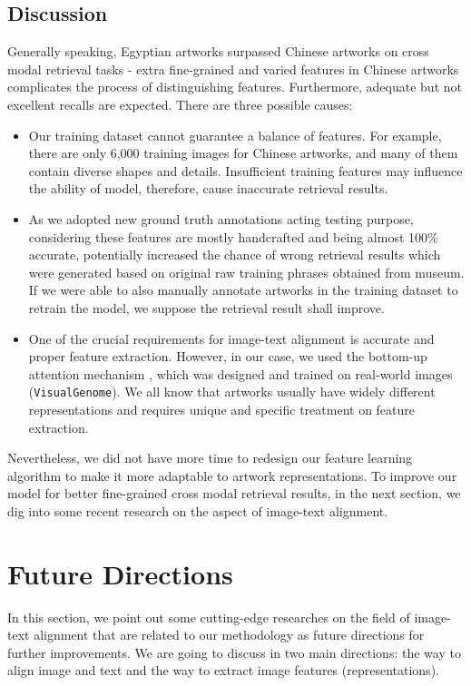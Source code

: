\subsection{Discussion}

Generally speaking, Egyptian artworks surpassed Chinese artworks on cross modal retrieval tasks - extra fine-grained and varied features in Chinese artworks complicates the process of distinguishing features. Furthermore, adequate but not excellent recalls are expected. There are three possible causes:

\begin{itemize}
    \item Our training dataset cannot guarantee a balance of features. For example, there are only 6,000 training images for Chinese artworks, and many of them contain diverse shapes and details. Insufficient training features may influence the ability of model, therefore, cause inaccurate retrieval results.
    \item As we adopted new ground truth annotations acting testing purpose, considering these features are mostly handcrafted and being almost 100\% accurate, potentially increased the chance of wrong retrieval results which were generated based on original raw training phrases obtained from museum. If we were able to also manually annotate artworks in the training dataset to retrain the model, we suppose the retrieval result shall improve.
    \item One of the crucial requirements for image-text alignment is accurate and proper feature extraction. However, in our case, we used the bottom-up attention mechanism \cite{bottomup}, which was designed and trained on real-world images (\verb|VisualGenome|). We all know that artworks usually have widely different representations and requires unique and specific treatment on feature extraction.
\end{itemize}

Nevertheless, we did not have more time to redesign our feature learning algorithm to make it more adaptable to artwork representations. To improve our model for better fine-grained cross modal retrieval results, in the next section, we dig into some recent research on the aspect of image-text alignment. 

\section{Future Directions}
In this section, we point out some cutting-edge researches on the field of image-text alignment that are related to our methodology as future directions for further improvements. We are going to discuss in two main directions: the way to align image and text and the way to extract image features (representations).

